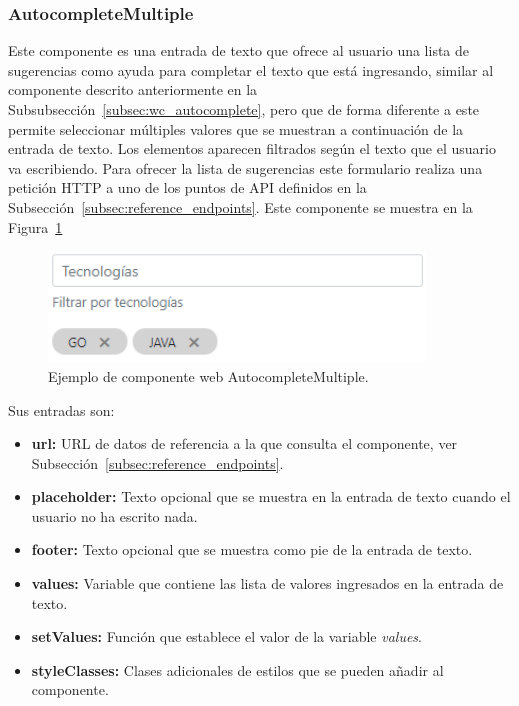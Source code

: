 \documentclass[a4paper, 12pt]{book}
\begin{document}
\subsubsection{AutocompleteMultiple}
\label{subsec:wc_autocomplete_multiple}
Este componente es una entrada de texto que ofrece al usuario una lista de sugerencias como ayuda para completar el texto que está ingresando,
similar al componente descrito anteriormente en la Subsubsección~\ref{subsec:wc_autocomplete}, pero que de forma diferente a este permite seleccionar múltiples valores que se muestran a continuación de la entrada de texto.
Los elementos aparecen filtrados según el texto que el usuario va escribiendo.
Para ofrecer la lista de sugerencias este formulario realiza una petición HTTP a uno de los puntos de API definidos en la Subsección~\ref{subsec:reference_endpoints}.
Este componente se muestra en la Figura~\ref{fig:component_autocomplete_multiple}

\begin{figure}
  \centering
  \includegraphics[width=10cm, keepaspectratio]{img/AutocompleteMultiple.PNG}
  \caption{Ejemplo de componente web AutocompleteMultiple.}\label{fig:component_autocomplete_multiple}
\end{figure}

Sus entradas son:

		\begin{itemize}
		\item \textbf{url:} URL de datos de referencia a la que consulta el componente, ver Subsección~\ref{subsec:reference_endpoints}.
		\item \textbf{placeholder:} Texto opcional que se muestra en la entrada de texto cuando el usuario no ha escrito nada.
		\item \textbf{footer:} Texto opcional que se muestra como pie de la entrada de texto.
		\item \textbf{values:} Variable que contiene las lista de valores ingresados en la entrada de texto.
		\item \textbf{setValues:} Función que establece el valor de la variable \emph{values}.
		\item \textbf{styleClasses:} Clases adicionales de estilos que se pueden añadir al componente.
		\end{itemize}
\end{document}
